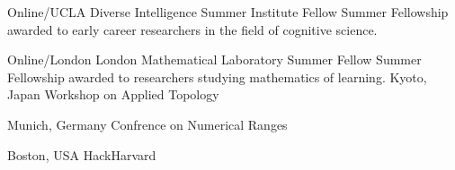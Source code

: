 {%
	Online/UCLA}
{%
	Diverse Intelligence Summer Institute Fellow}
{
	Summer Fellowship awarded to early career researchers in the field of cognitive science. 
}

{%
	Online/London}
{%
	London Mathematical Laboratory Summer Fellow}
{
	Summer Fellowship awarded to researchers studying mathematics of learning. 
}
%
%
{%
	Kyoto, Japan}
{%
	Workshop on Applied Topology}
{}

{%
	Munich, Germany}
{%
	Confrence on Numerical Ranges}
{}

{%
	Boston, USA}
{%
	HackHarvard}
{}
